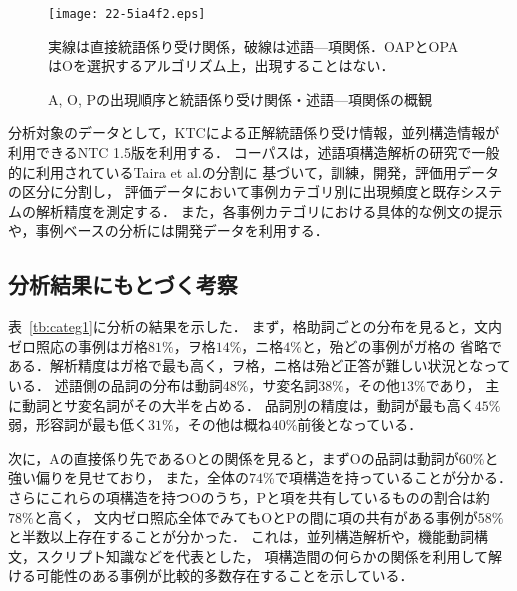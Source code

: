 \documentclass[japanese]{jnlp_1.4}
\begin{document}
\begin{figure}[t]
\begin{center}
\texttt{[image: 22-5ia4f2.eps]}
\end{center}
\caption{A, O, Pの出現順序と統語係り受け関係・述語—項関係の概観}
\label{fig:seq}
\par\small 実線は直接統語係り受け関係，破線は述語—項関係．OAPとOPAはOを選択するアルゴリズム上，出現することはない．
\par\vspace{-1\Cvs}
\end{figure}

分析対象のデータとして，KTCによる正解統語係り受け情報，並列構造情報が利用できるNTC 1.5版を利用する．
コーパスは，述語項構造解析の研究で一般的に利用されているTaira et al.\cite{taira2008japanese}の分割に
基づいて，訓練，開発，評価用データの区分に分割し，
評価データにおいて事例カテゴリ別に出現頻度と既存システムの解析精度を測定する．
また，各事例カテゴリにおける具体的な例文の提示や，事例ベースの分析には開発データを利用する．


\subsection{分析結果にもとづく考察}
\label{sec:discussion}

表~\ref{tb:categ1}に分析の結果を示した．
まず，格助詞ごとの分布を見ると，文内ゼロ照応の事例はガ格$81\%$，ヲ格$14\%$，ニ格$4\%$と，殆どの事例がガ格の
省略である．解析精度はガ格で最も高く，ヲ格，ニ格は殆ど正答が難しい状況となっている．
述語側の品詞の分布は動詞$48\%$，サ変名詞$38\%$，その他$13\%$であり，
主に動詞とサ変名詞がその大半を占める．
品詞別の精度は，動詞が最も高く$45\%$弱，形容詞が最も低く$31\%$，その他は概ね$40\%$前後となっている．

次に，Aの直接係り先であるOとの関係を見ると，まずOの品詞は動詞が$60\%$と強い偏りを見せており，
また，全体の$74\%$で項構造を持っていることが分かる．
さらにこれらの項構造を持つOのうち，Pと項を共有しているものの割合は約$78\%$と高く，
文内ゼロ照応全体でみてもOとPの間に項の共有がある事例が$58\%$と半数以上存在することが分かった．
これは，並列構造解析や，機能動詞構文，スクリプト知識などを代表とした，
項構造間の何らかの関係を利用して解ける可能性のある事例が比較的多数存在することを示している．

\begin{table}[p]
\centering{}
\end{table}
\end{document}
